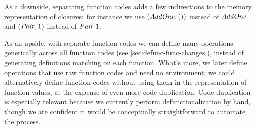 As a downside, separating function codes adds a few indirections to the memory
representation of closures: for instance we use \ensuremath{(\Conid{AddOne},())} instead of
\ensuremath{\Conid{AddOne}}, and \ensuremath{(\Conid{Pair},\mathrm{1})} instead of \ensuremath{\Conid{Pair}\;\mathrm{1}}.

As an upside, with separate function codes we can define many operations
generically across all function codes (see \cref{sec:defunc-func-changes}),
instead of generating definitions matching on each function. What's more, we
later define operations that use raw function codes and need no environment; we
could alternatively define function codes without using them in the
representation of function values, at the expense of even more code duplication.
%
Code duplication is especially relevant because we currently perform
defunctionalization by hand, though we are confident it would be conceptually
straightforward to automate the process.


